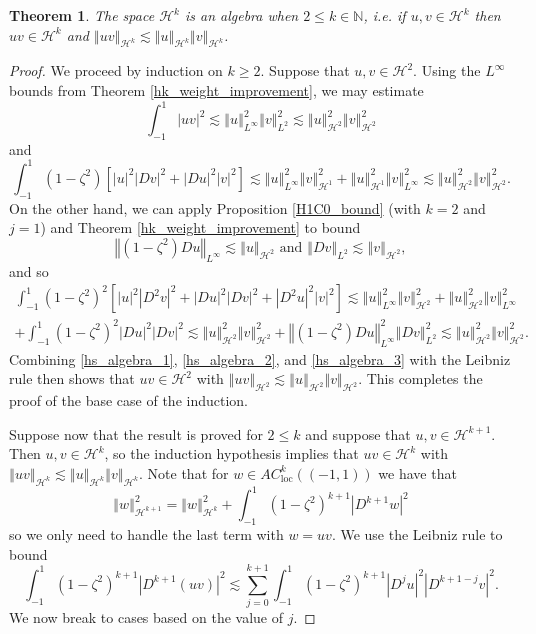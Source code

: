 \documentclass[11pt,reqno]{amsart}
\numberwithin{equation}{section}
\providecommand{\abs}[1]{\left\vert#1\right\vert}
\providecommand{\norm}[1]{\left\Vert#1\right\Vert}
\def\ls{\lesssim}
\providecommand{\abs}[1]{\left\vert#1\right\vert}
\providecommand{\norm}[1]{\left\Vert#1\right\Vert}
\def\ls{\lesssim}
\newcommand{\m}{\mathrm}
\def\h{\mathcal{H}}
\def\N{\mathbb{N}}
\def\acl{AC_{\m{loc}}}
\newtheorem{thm}[lem]{Theorem}
\begin{document}
\begin{thm}\label{hs_algebra}
The space $\h^k$ is an algebra when $2 \le k \in \N$, i.e. if $u,v \in \h^k$ then $uv \in \h^k$ and $\norm{uv}_{\h^k} \ls \norm{u}_{\h^k} \norm{v}_{\h^k}$. 
\end{thm}
\begin{proof}
We proceed by induction on $k \ge 2$.  Suppose that $u,v \in \h^2$.  Using the $L^\infty$ bounds from Theorem \ref{hk_weight_improvement}, we may estimate 
\begin{equation}\label{hs_algebra_1}
 \int_{-1}^1 \abs{uv}^2 \ls \norm{u}_{L^\infty}^2 \norm{v}_{L^2}^2 \ls \norm{u}_{\h^2}^2 \norm{v}_{\h^2}^2
\end{equation}
and 
\begin{equation}\label{hs_algebra_2}
 \int_{-1}^1 (1-\zeta^2) [\abs{u}^2 \abs{Dv}^2 + \abs{Du}^2 \abs{v}^2  ]  \ls 
 \norm{u}_{L^\infty}^2 \norm{v}_{\h^1}^2 + \norm{u}_{\h^1}^2 \norm{v}_{L^\infty}^2 
 \ls  \norm{u}_{\h^2}^2 \norm{v}_{\h^2}^2.
\end{equation}
On the other hand, we can apply Proposition \ref{H1C0_bound} (with $k=2$ and $j=1$) and Theorem \ref{hk_weight_improvement}  to bound 
\begin{equation}
 \norm{ (1-\zeta^2) D u }_{L^\infty} \ls \norm{u}_{\h^2} \text{ and } \norm{Dv}_{L^2} \ls \norm{v}_{\h^2},
\end{equation}
and so
\begin{multline}\label{hs_algebra_3}
 \int_{-1}^1 (1-\zeta^2)^2 [\abs{u}^2 \abs{D^2 v}^2 +  \abs{Du}^2 \abs{Dv}^2 + \abs{D^2 u}^2 \abs{v}^2  ]  \ls 
\norm{u}_{L^\infty}^2 \norm{v}_{\h^2}^2 +  \norm{u}_{\h^2}^2 \norm{v}_{L^\infty}^2 \\
+  \int_{-1}^1 (1-\zeta^2)^2  \abs{Du}^2 \abs{Dv}^2  
\ls \norm{u}_{\h^2}^2 \norm{v}_{\h^2}^2 +  \norm{ (1-\zeta^2) D u }_{L^\infty}^2 \norm{Dv}_{L^2}^2 \ls \norm{u}_{\h^2}^2 \norm{v}_{\h^2}^2.
\end{multline}
Combining \eqref{hs_algebra_1}, \eqref{hs_algebra_2}, and \eqref{hs_algebra_3} with the Leibniz rule then shows that $uv \in \h^2$ with $\norm{uv}_{\h^2} \ls \norm{u}_{\h^2} \norm{v}_{\h^2}$.  This completes the proof of the base case of the induction.


Suppose now that the result is proved for $2 \le k$ and suppose that $u,v \in \h^{k+1}$.  Then $u,v \in \h^k$, so the induction hypothesis implies that $uv \in \h^k$ with $\norm{uv}_{\h^k} \ls \norm{u}_{\h^k} \norm{v}_{\h^k}$.  Note that for $w \in \acl^{k}((-1,1))$ we have that 
\begin{equation}\label{hs_algebra_4}
 \norm{w}_{\h^{k+1}}^2 = \norm{w}_{\h^k}^2 + \int_{-1}^1 (1-\zeta^2)^{k+1} \abs{D^{k+1} w}^2 
\end{equation}
so we only need to handle the last term with $w = uv$.  We use the Leibniz rule to bound 
\begin{equation}\label{hs_algebra_5}
 \int_{-1}^1 (1-\zeta^2)^{k+1} \abs{D^{k+1}(uv)}^2 \ls   \sum_{j=0}^{k+1} \int_{-1}^1 (1-\zeta^2)^{k+1} \abs{D^j u}^2  \abs{D^{k+1-j} v}^2. 
\end{equation}
We now break to cases based on the value of $j$.


\end{proof}
\end{document}
